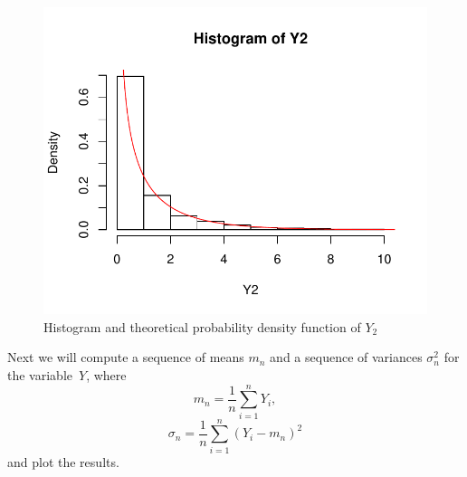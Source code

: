 \documentclass[12pt, a4paper]{article}\usepackage[]{graphicx}\usepackage[]{color}
\makeatletter
\def\maxwidth{ %
  \ifdim\Gin@nat@width>\linewidth
    \linewidth
  \else
    \Gin@nat@width
  \fi
}
\newenvironment{knitrout}{}{} %
\makeatother
\begin{document}
\begin{knitrout}
\color{fgcolor}\begin{figure}[H]

{\centering \includegraphics[width=\maxwidth]{figure/ex1_2hist-1} 

}

\caption[Histogram and theoretical probability density function of $Y_2$]{Histogram and theoretical probability density function of $Y_2$}\label{fig:ex1.2hist}
\end{figure}


\end{knitrout}


Next we will compute a sequence of means $m_n$ and a sequence of variances $\sigma_n^2$ for the variable~$Y$, where
\[ m_n = \frac{1}{n} \sum_{i=1}^{n} Y_i, \]
\[ \sigma_n = \frac{1}{n} \sum_{i=1}^{n} (Y_i - m_n)^2 \]
and plot the results.
\end{document}
